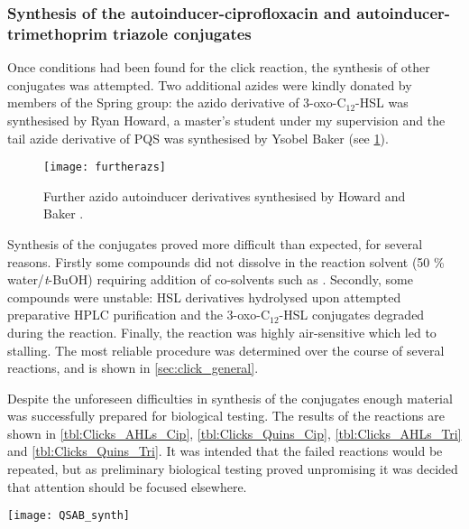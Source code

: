\subsubsection{Synthesis of the autoinducer-ciprofloxacin and autoinducer-trimethoprim triazole conjugates}

Once conditions had been found for the click reaction, the synthesis of other conjugates was attempted. 
Two additional azides were kindly donated by members of the Spring group: 
the azido derivative of 3-oxo-C$_{12}$-HSL  was synthesised by Ryan Howard, a master's student under my supervision\cite{Howard2015} and
the tail azide derivative of PQS  was synthesised by Ysobel Baker\cite{Baker2015} (see \ref{fig:furtherazs}).

\begin{figure}[H]
	\begin{center}
		\texttt{[image: furtherazs]}
		\caption{Further azido autoinducer derivatives synthesised by Howard\cite{Howard2015}  and Baker\cite{Baker2015} .\label{fig:furtherazs}} 
	\end{center}
\end{figure}

Synthesis of the conjugates proved more difficult than expected, for several reasons. Firstly some compounds did not dissolve in the reaction solvent (50 \% water/\textit{t}-BuOH) requiring addition of co-solvents such as . Secondly, some compounds were unstable: HSL derivatives hydrolysed upon attempted preparative HPLC purification and the 3-oxo-C$_{12}$-HSL conjugates degraded during the reaction. Finally, the reaction was highly air-sensitive which led to stalling. 
The most reliable procedure was determined over the course of several reactions, and is shown in \ref{sec:click_general}. 

Despite the unforeseen difficulties in synthesis of the conjugates enough material was successfully prepared for biological testing. The results of the reactions are shown in \ref{tbl:Clicks_AHLs_Cip}, \ref{tbl:Clicks_Quins_Cip}, \ref{tbl:Clicks_AHLs_Tri} and \ref{tbl:Clicks_Quins_Tri}. It was intended that the failed reactions would be repeated, but as preliminary biological testing  proved unpromising it was decided that attention should be focused elsewhere.


\begin{scheme}[H]
	\begin{center}
		\texttt{[image: QSAB\_synth]}
		\caption{General scheme for the click reaction, where R$_1$-N$_3$ is an azido autoinducer derivative and R$_2$-$\equiv$ is an alkynyl antibiotic derivative a), sodium ascorbate, THPTA, , \textit{t}-BuOH.\label{sch:QSAB_synth}} 
	\end{center}
\end{scheme}

